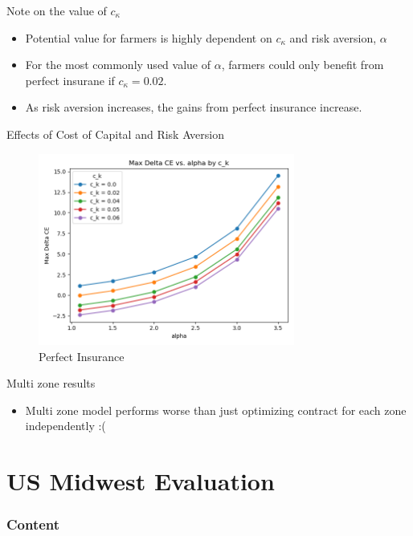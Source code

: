 \documentclass{beamer}
\begin{document}
\begin{frame}{Note on the value of $c_{\kappa}$}
    \begin{itemize}
        \item Potential value for farmers is highly dependent on $c_{\kappa}$ and risk aversion, $\alpha$
        \item For the most commonly used value of $\alpha$, farmers could only benefit from perfect insurane if $c_{\kappa}=0.02$.
        \item As risk aversion increases, the gains from perfect insurance increase. 
    \end{itemize}
\end{frame}

\begin{frame}{Effects of Cost of Capital and Risk Aversion}
    \begin{figure}
        \includegraphics[width=0.75\textwidth]{../../../output/figures/Feedback/MaxDeltaCE.png}
        \caption{Perfect Insurance}
    \end{figure}
    
\end{frame}


\begin{frame}{Multi zone results}
    \begin{itemize} 
        \item Multi zone model performs worse than just optimizing contract for each zone independently :(
    \end{itemize}
    
\end{frame}

\section{US Midwest Evaluation}
\begin{frame}
    \frametitle{Content}
    \tableofcontents[currentsection]
  \end{frame}
\end{document}
